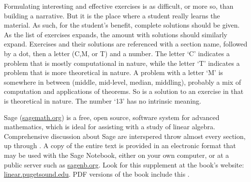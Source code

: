%
Formulating interesting and effective exercises is as difficult, or more so, than building a narrative.  But it is the place where a student really learns the material.  As such, for the student's benefit, complete solutions should be given.  As the list of exercises expands, the amount with solutions should similarly expand.  Exercises and their solutions are referenced with a section name, followed by a dot, then a letter (C,M, or T) and a number.   The letter `C' indicates a problem that is mostly computational in nature, while the letter `T' indicates a problem that is more theoretical in nature.  A problem with a letter `M' is somewhere in between (middle, mid-level, median, middling), probably a mix of computation and applications of theorems.  So  is a solution to an exercise in  that is theoretical in nature.  The number `13' has no intrinsic meaning.\par
%
Sage (\url{sagemath.org}) is a free, open source, software system for advanced mathematics, which is ideal for assisting with a study of linear algebra. Comprehensive discussion about Sage are interspered throw almost every section, up through .  A copy of the entire text is provided in an electronic format that may be used with the Sage Notebook, either on your own computer, or at a public server such as \url{sagenb.org}.  Look for this supplement at the book's website: \url{linear.pugetsound.edu}.  PDF versions of the book include this .
%
